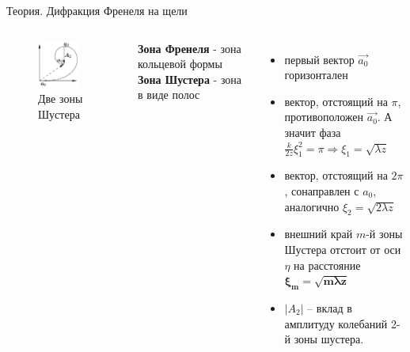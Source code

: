 \documentclass[11pt]{beamer} %
\begin{document}
    \begin{frame}{Теория. Дифракция Френеля на щели}
        \begin{columns}
            \begin{figure}[H]
                \centering
                \includegraphics[width = 0.8\textwidth]{images/theory_schuster_zone.jpg}
                \caption{Две зоны Шустера}
            \end{figure}
                \textbf{Зона Френеля} - зона кольцевой формы
                \textbf{Зона Шустера} - зона в виде полос
                \begin{itemize}
                    \item первый вектор $\Vec{a_0}$ горизонтален
                    \item вектор, отстоящий на $\pi$, противоположен $\Vec{a_0}$. А значит фаза $\frac{k}{2z}\xi_1^2 = \pi \Rightarrow \xi_1 = \sqrt{\lambda z}$ 
                    \item вектор, отстоящий на $2\pi$, сонаправлен с $a_0$, аналогично $\xi_2 = \sqrt{2\lambda z}$
                    \item внешний край $m$-й зоны Шустера отстоит от оси $\eta$ на расстояние $\mathbf{\xi_m = \sqrt{m\lambda z}}$
                    \item $|A_2|$ -- вклад в амплитуду колебаний 2-й зоны шустера.
                \end{itemize}
        \end{columns}
    \end{frame}
\end{document}
